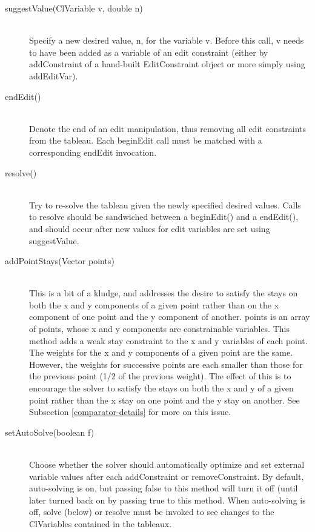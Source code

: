 \documentclass{article}
\begin{document}
\begin{description}
\item[{\sf suggestValue(ClVariable v, double n)}] \ \\
      Specify a new desired value, {\sf n}, for the variable {\sf v}.
      Before this call, {\sf v} needs to have been added as a variable
      of an edit constraint (either by {\sf addConstraint} of a
      hand-built {\sf EditConstraint} object or more simply using {\sf
        addEditVar}).
      

\item[{\sf endEdit()}] \ \\
      Denote the end of an edit manipulation, thus removing all edit
      constraints from the tableau.  Each {\sf beginEdit} call must be
      matched with a corresponding {\sf endEdit} invocation.

\item[{\sf resolve()}] \ \\
Try to re-solve the tableau given the newly specified desired values.
Calls to resolve should be sandwiched between a {\sf beginEdit()} and a
{\sf endEdit()}, and should occur after new values for edit variables
are set using {\sf suggestValue}.

\item[{\sf addPointStays(Vector points)}] \ \\
This is a bit of a kludge, and addresses the desire to satisfy the stays
on both the {\sf x} and {\sf y} components of a given point rather than
on the {\sf x} component of one point and the {\sf y} component of another.
{\sf points} is an array of points, whose {\sf x} and {\sf y} components
are constrainable variables.  This method adds a weak stay constraint to the {\sf x}
and {\sf y} variables of each point.  The weights for the {\sf x} and
{\sf y} components of a given point are the same.  However, the weights
for successive points are each smaller than those for the previous
point (1/2 of the previous weight).  The effect of this is to encourage the
solver to satisfy the stays on both the {\sf x} and {\sf y} of a given
point rather than the {\sf x} stay on one point and the {\sf y} stay on
another.  See Subsection \ref{comparator-details} for more on this issue.

\item[{\sf setAutoSolve(boolean f)}] \ \\
Choose whether the solver should automatically optimize and set external variable values
after each \textsf{addConstraint} or \textsf{removeConstraint}.  By
default, auto-solving is on, but passing \textsf{false} to this method
will turn it off (until later turned back on by passing \textsf{true} to 
this method.  When auto-solving is off, \textsf{solve} (below) or
\textsf{resolve} must be invoked to see changes to the
\textsf{ClVariable}s contained in the tableaux.


\end{description}
\end{document}
